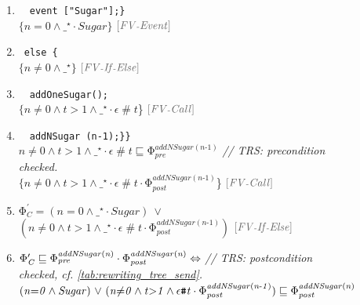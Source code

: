 \documentclass[acmsmall,10pt,review]{acmart}
\newcommand{\siderule}[1]{
\code{\footnotesize{\textcolor{mGray}{#1}}}}
\newcommand{\effect}{{\ensuremath{\mathrm{\Phi}}}}
\newcommand{\anyevent}[1]{{\textcolor{darkred}
{{\textbf{\small #1}}}}}
\newcommand{\code}[1]{{\tt{\ensuremath{\m{#1}}}}}
\newcommand{\CONTAIN}{\sqsubseteq}
\newcommand{\m}{\mathit}
\newcommand{\mysharp}{{\mathrel{\texttt{\#}}}}
\begin{document}
{\begin{figure}[!ht]
\begin{minipage}[c]{\columnwidth}
{\begin{enumerate}
      \item ~\qquad~\qquad \lstinline|event ["Sugar"];} |  \\
     \textcolor{darklavender}{\code{\{n{=}0 \wedge   \_^\star \cdot Sugar\} }} 
     \quad \siderule{\scriptsize [FV\text{-}Event]}
     \item 
     ~\qquad \lstinline|else {| \\
     \textcolor{darklavender}{\code{\{ n  {\neq} 0 \wedge   \_^\star \}  }} 
     \quad \siderule{\scriptsize [FV\text{-}If\text{-}Else]}
    \item 
     ~\qquad~\qquad \lstinline|addOneSugar();| \\
     \textcolor{darklavender}{\code{\{n  {\neq} 0 \wedge  t{>}1  \wedge \_^\star \cdot \epsilon \mysharp t  }\}} 
     \quad \siderule {\scriptsize [FV\text{-}Call]}
     \item 
     ~\qquad~\qquad \lstinline|addNSugar (n-1);}}|  \\
     \textcolor{huntergreen}{\code{n  {\neq} 0   \wedge t{>}1  \wedge \_^\star \cdot \epsilon \mysharp t   \CONTAIN \effect_{pre}^{addNSugar(n\text{-}1)} }}
      \quad \textcolor{mGray}{\footnotesize  \emph{// TRS: precondition checked.}}
\\
     \textcolor{darklavender}{\code{\{n  {\neq} 0  \wedge t{>}1  \wedge \_^\star 
     \cdot \epsilon \mysharp t \cdot \effect_{post}^{addNSugar(n\text{-}1)} }\}} 
     \quad \siderule {\scriptsize [FV\text{-}Call]}
      \item \textcolor{darklavender}{\code{\effect_C^\prime {=} (n{=}0 \wedge  \_^\star \cdot Sugar)\ \vee\ }
      \code{ (n  {\neq} 0  \wedge t{>}1  \wedge \_^\star \cdot \epsilon \mysharp t \cdot \effect_{post}^{addNSugar(n\text{-}1)} ) }} 
      \quad \siderule{\scriptsize [FV\text{-}If\text{-}Else]}
      \\
       \item 
       \textcolor{darkred}{\code{
       \effect_C^\prime \CONTAIN \effect_{pre}^{addNSugar(n)} \cdot \effect_{post}^{addNSugar(n)} \Leftrightarrow  }}  
       \quad \textcolor{mGray}{\footnotesize  \emph{// TRS: postcondition checked, cf. \autoref{tab:rewriting_tree_send}. }}
        \\ 
        \textcolor{darkred}{\code{\code{\code{(n{=}0 \wedge Sugar)\ \vee\ }
        \code{ (n  {\neq} 0  \wedge  t{>}1  \wedge \epsilon \mysharp t \cdot \effect_{post}^{addNSugar(n\text{-}1)}) } \CONTAIN \effect_{post}^{addNSugar(n)}}}}\\
    

\end{enumerate}}
\end{minipage}
\end{figure}}
\end{document}
